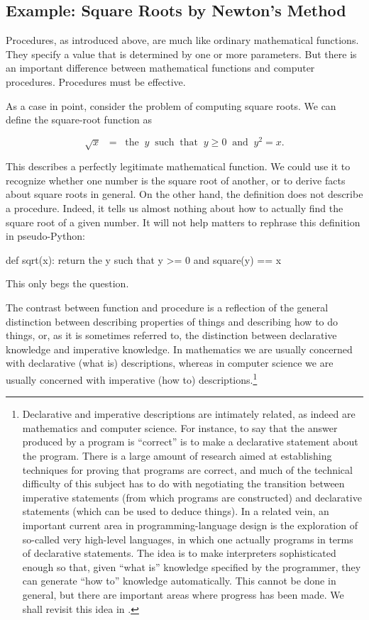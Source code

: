 \subsection{Example: Square Roots by Newton's Method}
\label{Section 1.1.7}

Procedures, as introduced above, are much like ordinary mathematical functions.
They specify a value that is determined by one or more parameters.  But there
is an important difference between mathematical functions and computer
procedures.  Procedures must be effective.

As a case in point, consider the problem of computing square roots.  We can
define the square-root function as

$$\sqrt{x}\;\; = {\mathrm{\;\; the\;\;}} y
{\mathrm{\;\; such\;\; that\;\;}} y \ge 0 {\mathrm{\;\; and\;\;}} y^2 = x.$$

This describes a perfectly legitimate mathematical function.  We could use it
to recognize whether one number is the square root of another, or to derive
facts about square roots in general.  On the other hand, the definition does
not describe a procedure.  Indeed, it tells us almost nothing about how to
actually find the square root of a given number.  It will not help matters to
rephrase this definition in pseudo-Python:

\begin{syntaxForm}
def sqrt(x):
    return the y such that y >= 0 and square(y) == x
\end{syntaxForm}

\noindent
This only begs the question.

The contrast between function and procedure is a reflection of the general
distinction between describing properties of things and describing how to do
things, or, as it is sometimes referred to, the distinction between declarative
knowledge and imperative knowledge.  In mathematics we are usually concerned
with declarative (what is) descriptions, whereas in computer science we are
usually concerned with imperative (how to) descriptions.\footnote{Declarative
and imperative descriptions are intimately related, as indeed are mathematics
and computer science.  For instance, to say that the answer produced by a
program is ``correct'' is to make a declarative statement about the program.
There is a large amount of research aimed at establishing techniques for
proving that programs are correct, and much of the technical difficulty of this
subject has to do with negotiating the transition between imperative statements
(from which programs are constructed) and declarative statements (which can be
used to deduce things).  In a related vein, an important current area in
programming-language design is the exploration of so-called very high-level
languages, in which one actually programs in terms of declarative statements.
The idea is to make interpreters sophisticated enough so that, given ``what
is'' knowledge specified by the programmer, they can generate ``how to''
knowledge automatically.  This cannot be done in general, but there are
important areas where progress has been made.  We shall revisit this idea in
.}

